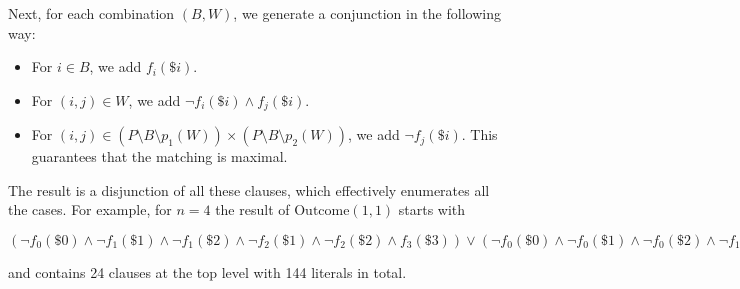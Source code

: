 \begin{example}[Mastermind]
Next, for each combination $(B, W)$, we generate a conjunction
  in the following way:
\begin{itemize}
\item For $i\in B$, we add $f_i(\$i)$.
\item For $(i,j)\in W$, we add $\neg f_i(\$i) \wedge f_j(\$i)$.
\item For $(i,j)\in (P\setminus B\setminus p_1(W))
             \times (P\setminus B\setminus p_2(W))$, we add $\neg f_j(\$i)$.
  This guarantees that the matching is maximal.
\end{itemize}

The result is a disjunction of all these clauses, which effectively enumerates all the cases.
For example, for $n = 4$ the result of $\textrm{Outcome}(1, 1)$ starts with

\smallskip
\begin{scriptsize}$(
\neg f_0(\$0) \wedge \neg f_1(\$1) \wedge \neg f_1(\$2) \wedge
  \neg f_2(\$1) \wedge \neg f_2(\$2) \wedge f_3(\$3)) \vee
(\neg f_0(\$0) \wedge \neg f_0(\$1) \wedge \neg f_0(\$2) \wedge
  \neg f_1(\$0) \wedge \neg f_1(\$1) \wedge \neg f_2(\$1) \wedge
  \neg f_2(\$2) \wedge f_3(\$3)) \vee
(\neg f_0(\$0) \wedge \neg f_0(\$1) \wedge \neg f_0(\$2) \wedge
   \neg f_1(\$1) \wedge \neg f_1(\$2) \wedge \neg f_2(\$0) \wedge
   \neg f_2(\$2) \wedge f_3(\$3)) \vee
(\neg f_0(\$0) \wedge \neg f_0(\$2) \wedge \neg f_1(\$0) \wedge
  \neg f_1(\$1) \wedge \neg f_2(\$0) \wedge \neg f_2(\$1) \wedge
  \neg f_2(\$2) \wedge f_3(\$3)) \vee
(\neg f_0(\$0) \wedge \neg f_0(\$1) \wedge \neg f_1(\$1) \wedge
  \neg f_1(\$2) \wedge \neg f_2(\$0) \wedge \neg f_2(\$1) \wedge
  \neg f_2(\$2) \wedge f_3(\$3)) \vee
(\neg f_0(\$0) \wedge \neg f_0(\$1) \wedge \neg f_1(\$0) \wedge
  \neg f_1(\$1) \wedge \neg f_2(\$2) \wedge f_3(\$3)) \vee
(\neg f_0(\$0) \wedge \neg f_0(\$1) \wedge \neg f_1(\$0) \wedge
  \neg f_1(\$1) \wedge \neg f_1(\$2) \wedge \neg f_2(\$0) \wedge
  \neg f_2(\$2) \wedge f_3(\$3)) \vee
(\neg f_0(\$0) \wedge \neg f_0(\$2) \wedge \neg f_1(\$1) \wedge
  \neg f_2(\$0) \wedge \neg f_2(\$2) \wedge f_3(\$3)) \vee
(\neg f_0(\$0) \wedge \neg f_0(\$2) \wedge \neg f_1(\$0) \wedge
  \neg f_1(\$1) \wedge \neg f_1(\$2) \wedge \neg f_2(\$1) \wedge
  \neg f_2(\$2) \wedge f_3(\$3)) \vee ...,$
\end{scriptsize}

and contains 24 clauses at the top level with 144 literals in total. \eqed
\end{example}


